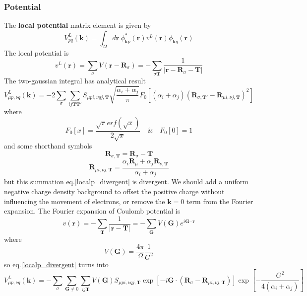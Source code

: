 \documentclass{article}
\begin{document}
        \subsubsection{Potential}
            The \textbf{local potential} matrix element\cite{McClain2017} is given by
            \begin{equation}
                V_{pq}^L(\textbf{k}) = \int_{\Omega}d\textbf{r}\ \phi_{\textbf{k}p}^*(\textbf{r})v^L(\textbf{r})\phi_{\textbf{k}q}(\textbf{r})
            \end{equation}
            The local potential is
            $$ v^L(\textbf{r}) = \sum_{\sigma}V(\textbf{r}-\textbf{R}_{\sigma}) = -\sum_{\sigma\textbf{T}}\frac{1}{|\textbf{r}-\textbf{R}_{\sigma}-\textbf{T}|} $$
            The two-gaussian integral has analytical result
            \begin{equation}
                V_{\mu p,\nu q}^L(\textbf{k}) = -2\sum_{\sigma}\sum_{ij\textbf{T}\textbf{T}'}S_{\mu pi,\nu qj,\textbf{T}}\sqrt{\frac{\alpha_i+\alpha_j}{\pi}}
                F_0\left[(\alpha_i+\alpha_j)(\textbf{R}_{\sigma,\textbf{T}'}-\textbf{R}_{\mu i,\nu j,\textbf{T}})^2\right]\label{localp_divergent}
            \end{equation}
            where
            $$ F_0\left[x\right] = \frac{\sqrt{\pi}erf(\sqrt{x})}{2\sqrt{x}} \quad \& \quad F_0\left[0\right] = 1 $$
            and some shorthand symbols
            $$ \textbf{R}_{\sigma,\textbf{T}} = \textbf{R}_{\sigma}-\textbf{T} $$
            $$ \textbf{R}_{\mu i,\nu j,\textbf{T}} = \frac{\alpha_i\textbf{R}_{\mu}+\alpha_j\textbf{R}_{\nu,\textbf{T}}}{\alpha_i+\alpha_j} $$
            but this summation eq.\eqref{localp_divergent} is divergent.
            We should add a uniform negative charge density background to offset the positive charge without influencing the movement of electrons,
            or remove the $\textbf{k}=0$ term from the Fourier expansion.
            The Fourier expansion of Coulomb potential is
            \begin{equation}
                v(\textbf{r}) = -\sum_{\textbf{T}}\frac{1}{|\textbf{r}-\textbf{T}|}= -\sum_{\textbf{G}}V(\textbf{G})e^{i\textbf{G}\cdot\textbf{r}}
            \end{equation}
            where
            \begin{equation}
                V(\textbf{G}) = \frac{4\pi}{\Omega}\frac{1}{G^2}
            \end{equation}
            so eq.\eqref{localp_divergent} turns into
            \begin{equation}
                V_{\mu p,\nu q}^L(\textbf{k}) = -\sum_{\sigma}\sum_{\textbf{G}\neq 0}\sum_{ij\textbf{T}}V(\textbf{G})S_{\mu pi,\nu qj,\textbf{T}}
                \exp\left[-i\textbf{G}\cdot(\textbf{R}_{\sigma}-\textbf{R}_{\mu i,\nu j,\textbf{T}})\right]\exp\left[-\frac{G^2}{4(\alpha_i+\alpha_j)}\right]\label{localp_real}
            \end{equation}
\end{document}
